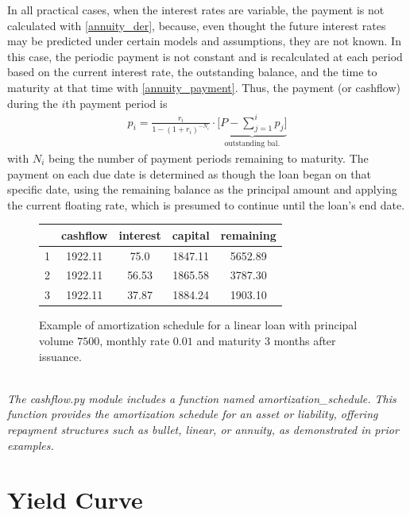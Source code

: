 \documentclass[11pt]{report}
\begin{document}
In all practical cases, when the interest rates are variable, the payment is not calculated with \eqref{annuity_der}, because, even thought the future interest rates may be predicted under certain models and assumptions, they are not known. In this case, the periodic payment is not constant and is recalculated at each period based on the current interest rate, the outstanding balance, and the time to maturity at that time with \eqref{annuity_payment}. Thus, the payment (or cashflow) during the $i$th payment period is
\begin{align}
	p_i=\frac{r_i}{1-(1+r_i)^{-N_i}}\cdot \underbrace{\bigg [P-\sum_{j=1}^ip_j\bigg]}_{\text{outstanding bal.}}
	\label{annuity}
\end{align}
with $N_i$ being the number of payment periods remaining to maturity. The payment on each due date is determined as though the loan began on that specific date, using the remaining balance as the principal amount and applying the current floating rate, which is presumed to continue until the loan's end date.
\begin{figure}[ht!]
	\centering
	\begin{tabular}{|c|c|c|c|c|}
		\hline
		& cashflow & interest & capital & remaining\\
		\hline
		1 & 1922.11 & 75.0 & 1847.11 & 5652.89\\
		\hline
		2 & 1922.11 & 56.53 & 1865.58 & 3787.30\\
		\hline
		3 & 1922.11 & 37.87 & 1884.24 & 1903.10\\
		\hline
	\end{tabular}
	\caption{Example of amortization schedule for a linear loan with principal volume $7500$, monthly rate $0.01$ and maturity 3 months after issuance.}
\end{figure}\\

\textit{The cashflow.py module includes a function named amortization\_schedule. This function provides the amortization schedule for an asset or liability, offering repayment structures such as bullet, linear, or annuity, as demonstrated in prior examples.}

\section{Yield Curve}
\end{document}
